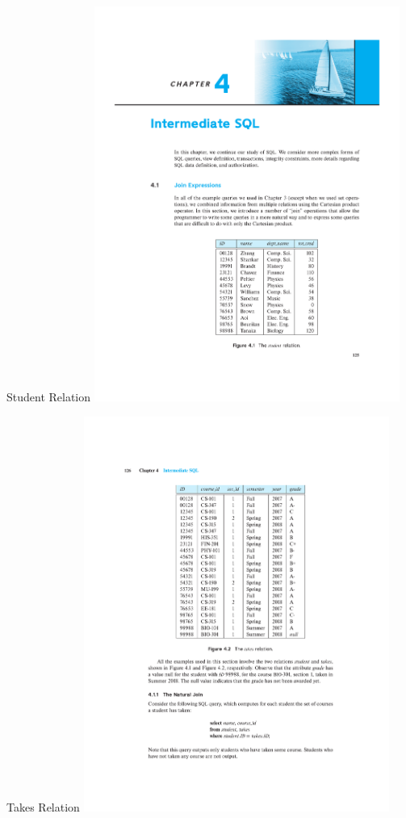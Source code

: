 \documentclass{beamer}
\begin{document}
\begin{frame}{Student Relation}
    \centering
    \includegraphics[width=0.75\textwidth, trim={8cm 4.5cm 5cm 16cm}, clip]{pages/nj1.pdf}
\end{frame}

\begin{frame}{Takes Relation}
    \centering
    \includegraphics[width=0.75\textwidth, trim={4.5cm 12cm 5.5cm 4.5cm}, clip]{pages/nj2.pdf}
\end{frame}
\end{document}
